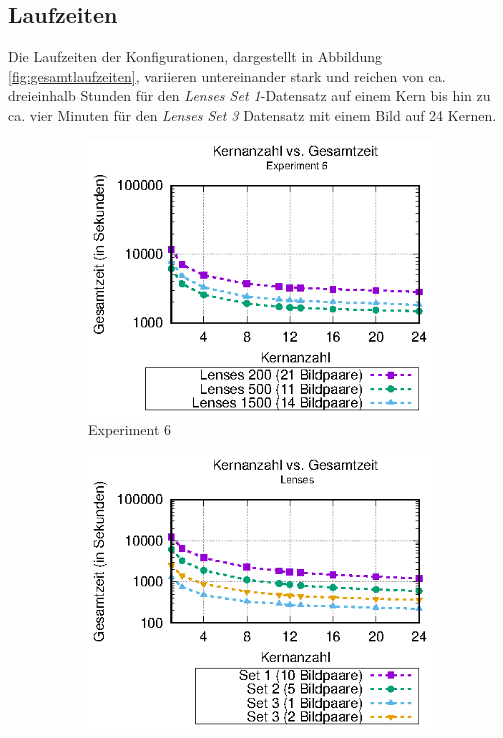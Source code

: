 \subsection{Laufzeiten}

Die Laufzeiten der Konfigurationen, dargestellt in Abbildung \ref{fig:gesamtlaufzeiten}, variieren untereinander stark und reichen von ca. dreieinhalb Stunden für den \textit{Lenses Set 1}-Datensatz auf einem Kern bis hin zu ca. vier Minuten für den \textit{Lenses Set 3} Datensatz mit einem Bild auf 24 Kernen.

\begin{center}
	\begin{figure}
		\begin{subfigure}[b]{0.49\textwidth}
			\centering
			\includegraphics[width=\textwidth]{pdf/times_exp6}
			\caption[Experiment 6]{Experiment 6}
			\label{fig:times_exp6}
		\end{subfigure}
		\hfill
		\begin{subfigure}[b]{0.49\textwidth}
			\centering
			\includegraphics[width=\textwidth]{pdf/times_lenses}

\end{subfigure}
\end{figure}
\end{center}
